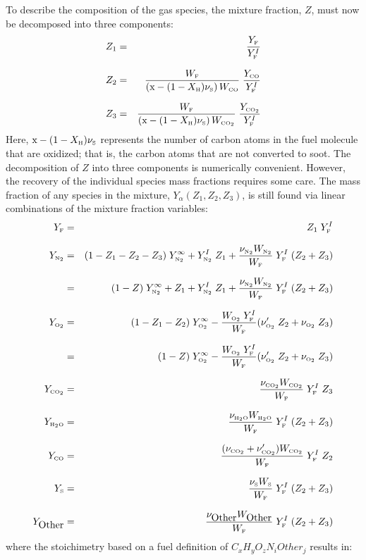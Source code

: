 \documentclass[11pt]{book}
\begin{document}
To describe the composition of the gas species, the mixture fraction, $Z$, must now be decomposed into three components:
\begin{eqnarray}  Z_1 &=& \frac{Y_{\tiny \hbox{F}}}{Y_{\tiny \hbox{F}}^I}   \\*[.1in]
                  Z_2 &=& \frac{W_{\tiny \hbox{F}}}{(\hbox{x}-(1-X_{\tiny \hbox{H}}) \nu_{\tiny \hbox{S}}) \, W_{\tiny \hbox{CO}} }    \;  \frac{Y_{\tiny \hbox{CO}}}{Y_{\tiny \hbox{F}}^I} \\*[.1in]
                  Z_3 &=& \frac{W_{\tiny \hbox{F}}}{(\hbox{x}-(1-X_{\tiny \hbox{H}}) \nu_{\tiny \hbox{S}}) \, W_{\tiny \hbox{CO}_2} } \;  \frac{Y_{\tiny \hbox{CO}_2}}{Y_{\tiny \hbox{F}}^I}  \end{eqnarray}
Here, $\hbox{x}-(1-X_{\tiny \hbox{H}}) \nu_{\tiny \hbox{S}}$ represents the number of carbon atoms in the fuel molecule that are oxidized; that is, the carbon atoms that are not converted to soot.
The decomposition of $Z$ into three components is numerically convenient. However, the recovery of the
individual species mass fractions requires some care.  The mass fraction of any species in the mixture,
$Y_\alpha(Z_1,Z_2,Z_3)$, is still found via linear combinations of the mixture fraction variables:
\begin{eqnarray}  Y_{\tiny \hbox{F}}     &=& Z_1 \; Y_{\tiny \hbox{F}}^I   \\*[.1in]
                  Y_{\tiny \hbox{N}_2}  &=& (1 - Z_1 - Z_2 - Z_3) \; Y_{\tiny \hbox{N}_2}^\infty + Y_{\tiny \hbox{N}_2}^I \; Z_1 + \frac{\nu_{\tiny \hbox{N}_2} W_{\tiny \hbox{N}_2}}{W_{\tiny \hbox{F}}} \; Y_{\tiny \hbox{F}}^I \; (Z_2+Z_3) \\*[.1in]
                           &=&  (1 - Z) \; Y_{\tiny \hbox{N}_2}^\infty + Z_1  + Y_{\tiny \hbox{N}_2}^I \; Z_1 + \frac{\nu_{\tiny \hbox{N}_2} W_{\tiny \hbox{N}_2}}{W_{\tiny \hbox{F}}} \; Y_{\tiny \hbox{F}}^I \; (Z_2+Z_3)  \\*[.1in]
                  Y_{\tiny \hbox{O}_2}  &=& (1 - Z_1 - Z_2) \; Y_{\tiny \hbox{O}_2}^\infty - \frac{W_{\tiny \hbox{O}_2}\; Y_{\tiny \hbox{F}}^I}{W_{\tiny \hbox{F}}} (\nu_{\tiny \hbox{O}_2}'  \; Z_2 +\nu_{\tiny \hbox{O}_2}  \; Z_3)\\*[.1in]
                           &=& (1 - Z) \; Y_{\tiny \hbox{O}_2}^\infty  - \frac{W_{\tiny \hbox{O}_2} \; Y_{\tiny \hbox{F}}^I}{W_{\tiny \hbox{F}}} (\nu_{\tiny \hbox{O}_2}'  \; Z_2 +\nu_{\tiny \hbox{O}_2}  \; Z_3) \\*[.1in]
                  Y_{\tiny \hbox{CO}_2} &=& \frac{\nu_{\tiny \hbox{CO}_2} W_{\tiny \hbox{CO}_2}}{W_{\tiny \hbox{F}}} \; Y_{\tiny \hbox{F}}^I \; Z_3 \\*[.1in]
                  Y_{\tiny \hbox{H}_2\hbox{O}} &=& \frac{\nu_{\tiny \hbox{H}_2\hbox{O}} W_{\tiny \hbox{H}_2\hbox{O}}}{W_{\tiny \hbox{F}}} \; Y_{\tiny \hbox{F}}^I \; (Z_2 + Z_3) \\*[.1in]
                  Y_{\tiny \hbox{CO}}    &=& \frac{(\nu_{\tiny \hbox{CO}_2}+\nu_{\tiny \hbox{CO}_2}') W_{\tiny \hbox{CO}_2}}{W_{\tiny \hbox{F}}} \; Y_{\tiny \hbox{F}}^I \; Z_2 \\*[.1in]
                  Y_{\tiny \hbox{S}}     &=& \frac{\nu_{\tiny \hbox{S}} W_{\tiny \hbox{S}}}{W_{\tiny \hbox{F}}} \; Y_{\tiny \hbox{F}}^I \; (Z_2 + Z_3) \\*[.1in]
                  Y_{\hbox{Other}} &=& \frac{\nu_{\hbox{Other}} W_{\hbox{Other}}}{W_{\tiny \hbox{F}}} \; Y_{\tiny \hbox{F}}^I \; (Z_2 + Z_3)
\end{eqnarray}
where the stoichimetry based on a fuel definition of $C_x H_y O_z N_i Other_j$ results in:
\end{document}
